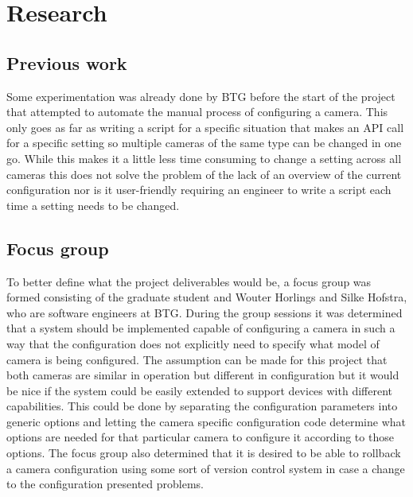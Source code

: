 \chapter{Research}

\section{Previous work}
Some experimentation was already done by BTG before the start of the project that attempted to automate the manual process of configuring a camera.
This only goes as far as writing a script for a specific situation that makes an API call for a specific setting so multiple cameras of the same type can be changed in one go.
While this makes it a little less time consuming to change a setting across all cameras this does not solve the problem of the lack of an overview of the current configuration nor is it user-friendly requiring an engineer to write a script each time a setting needs to be changed.

\section{Focus group}
To better define what the project deliverables would be, a focus group was formed consisting of the graduate student and  Wouter Horlings and Silke Hofstra, who are software engineers at BTG.
During the group sessions it was determined that a system should be implemented capable of configuring a camera in such a way that the configuration does not explicitly need to specify what model of camera is being configured.
The assumption can be made for this project that both cameras are similar in operation but different in configuration but it would be nice if the system could be easily extended to support devices with different capabilities.
This could be done by separating the configuration parameters into generic options and letting the camera specific configuration code determine what options are needed for that particular camera to configure it according to those options.
The focus group also determined that it is desired to be able to rollback a camera configuration using some sort of version control system in case a change to the configuration presented problems.


